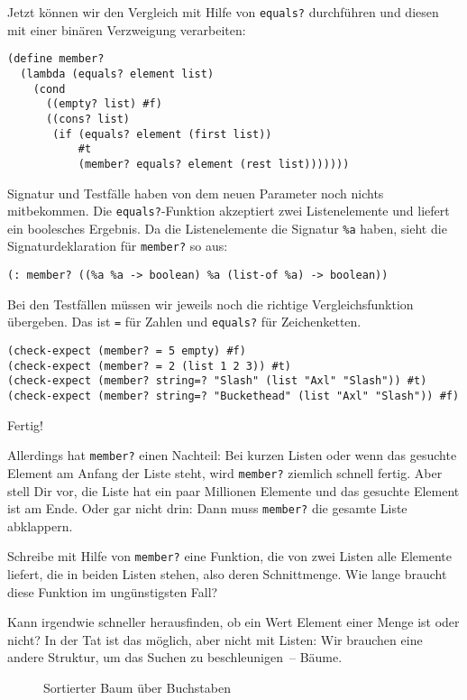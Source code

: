 Jetzt können wir den Vergleich mit Hilfe von \lstinline{equals?}
durchführen und diesen mit einer binären Verzweigung verarbeiten:
%
\begin{lstlisting}
(define member?
  (lambda (equals? element list)
    (cond
      ((empty? list) #f)
      ((cons? list)
       (if (equals? element (first list))
           #t
           (member? equals? element (rest list)))))))
\end{lstlisting}
%
Signatur und Testfälle haben von dem neuen Parameter noch nichts
mitbekommen.  Die \lstinline{equals?}-Funktion akzeptiert zwei
Listenelemente und liefert ein boolesches Ergebnis.  Da die
Listenelemente die Signatur \lstinline{%a}
haben, sieht die Signaturdeklaration für \lstinline{member?} so aus:
%
\begin{lstlisting}
(: member? ((%a %a -> boolean) %a (list-of %a) -> boolean))
\end{lstlisting}
%
Bei den Testfällen müssen wir jeweils noch die richtige
Vergleichsfunktion übergeben.  Das ist \lstinline{=} für Zahlen und
\lstinline{equals?} für Zeichenketten.
%
\begin{lstlisting}
(check-expect (member? = 5 empty) #f)
(check-expect (member? = 2 (list 1 2 3)) #t)
(check-expect (member? string=? "Slash" (list "Axl" "Slash")) #t)
(check-expect (member? string=? "Buckethead" (list "Axl" "Slash")) #f)
\end{lstlisting}
%
Fertig!

Allerdings hat \lstinline{member?} einen Nachteil: Bei kurzen Listen
oder wenn das gesuchte Element am Anfang der Liste steht, wird
\lstinline{member?} ziemlich schnell fertig.  Aber stell Dir vor, die
Liste hat ein paar Millionen Elemente und das gesuchte Element ist am
Ende.  Oder gar nicht drin: Dann muss \lstinline{member?} die gesamte
Liste abklappern.
%
\begin{aufgabeinline}
  Schreibe mit Hilfe von \lstinline{member?} eine Funktion, die von
  zwei Listen alle Elemente liefert, die in beiden Listen stehen, also
  deren Schnittmenge.  Wie lange braucht diese Funktion im
  ungünstigsten Fall?
\end{aufgabeinline}
%
Kann irgendwie schneller herausfinden, ob ein Wert Element einer Menge
ist oder nicht?  In der Tat ist das möglich, aber nicht mit Listen:
Wir brauchen eine andere Struktur, um das Suchen zu beschleunigen~--
Bäume.

\begin{figure}[tb]
  \caption{Sortierter Baum über Buchstaben}
  \label{fig:searchtree}
\end{figure}

